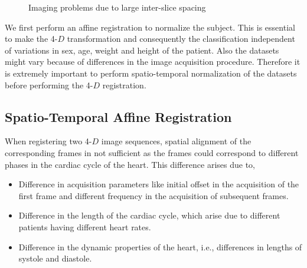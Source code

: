 \begin{figure}
\centering
          \hspace{.15in}
     \caption{Imaging problems due to large inter-slice spacing}     
     \label{fig:slice-thick}
\end{figure} 

We first perform an affine registration to normalize the subject. This is essential to make the 4-$D$ transformation and consequently the classification independent of variations in sex, age, weight and height of the patient. Also the datasets might vary because of differences in the image acquisition procedure. Therefore it is extremely important to perform spatio-temporal normalization of the datasets before performing the 4-$D$ registration.

\subsection{Spatio-Temporal Affine Registration}

When registering two 4-$D$ image sequences, spatial alignment of the corresponding frames in not sufficient as the frames could correspond to different phases in the cardiac cycle of the heart. This difference arises due to,
\begin{itemize}
	\item Difference in acquisition parameters like initial offset in the acquisition of the first frame and different frequency in the acquisition of subsequent frames. 
	\item Difference in the length of the cardiac cycle, which arise due to different patients having different heart rates.
	\item Difference in the dynamic properties of the heart, i.e., differences in lengths of systole and diastole.
\end{itemize}

